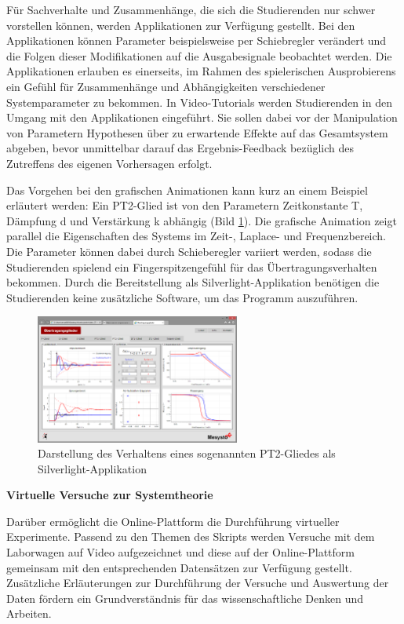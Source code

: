 \noindent Für Sachverhalte und Zusammenhänge, die sich die Studierenden nur schwer vorstellen können, werden Applikationen zur Verfügung gestellt. Bei den Applikationen können Parameter beispielsweise per Schiebregler verändert und die Folgen dieser Modifikationen auf die Ausgabesignale beobachtet werden. Die Applikationen erlauben es einerseits, im Rahmen des spielerischen Ausprobierens ein Gefühl für Zusammenhänge und Abhängigkeiten verschiedener Systemparameter zu bekommen. In Video-Tutorials werden Studierenden in den Umgang mit den Applikationen eingeführt. Sie sollen dabei vor der Manipulation von Parametern Hypothesen über zu erwartende Effekte auf das Gesamtsystem abgeben, bevor unmittelbar darauf das Ergebnis-Feedback bezüglich des Zutreffens des eigenen Vorhersagen erfolgt. 

\clearpage

\noindent Das Vorgehen bei den grafischen Animationen kann kurz an einem Beispiel erläutert werden: Ein PT2-Glied ist von den Parametern Zeitkonstante T, Dämpfung d und Verstärkung k abhängig (Bild \ref{fig:PT2-Gliede}). Die grafische Animation zeigt parallel die Eigenschaften des Systems im Zeit-, Laplace- und Frequenzbereich. Die Parameter können dabei durch Schieberegler variiert werden, sodass die Studierenden spielend ein Fingerspitzengefühl für das Übertragungsverhalten bekommen. Durch die Bereitstellung als Silverlight-Applikation benötigen die Studierenden keine zusätzliche Software, um das Programm auszuführen.

\begin{figure}[H]
  \centerline{\includegraphics[width=0.6\textwidth]{Einleitung/Bilder/image7.png}}
  \caption{Darstellung des Verhaltens eines sogenannten PT2-Gliedes als Silverlight-Applikation}
  \label{fig:PT2-Gliede}
\end{figure}
\medskip

{\selectfont
\noindent\textbf{Virtuelle Versuche zur Systemtheorie}} \smallskip

\noindent Darüber ermöglicht die Online-Plattform die Durchführung virtueller Experimente. Passend zu den Themen des Skripts werden Versuche mit dem Laborwagen auf Video aufgezeichnet und diese auf der Online-Plattform gemeinsam mit den entsprechenden Datensätzen zur Verfügung gestellt. Zusätzliche Erläuterungen zur Durchführung der Versuche und Auswertung der Daten fördern ein Grundverständnis für das wissenschaftliche Denken und Arbeiten. 


